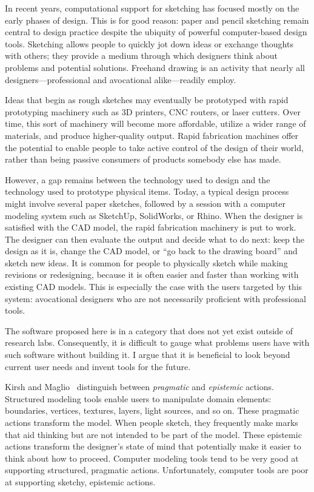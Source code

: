 \documentclass[12pt]{article}
\begin{document}
In recent years, computational support for sketching has focused
mostly on the early phases of design. This is for good reason: paper
and pencil sketching remain central to design practice despite the
ubiquity of powerful computer-based design tools. Sketching allows
people to quickly jot down ideas or exchange thoughts with others;
they provide a medium through which designers think about problems and
potential solutions. Freehand drawing is an activity that nearly all
designers---professional and avocational alike---readily employ.

Ideas that begin as rough sketches may eventually be prototyped with
rapid prototyping machinery such as 3D printers, CNC routers, or laser
cutters. Over time, this sort of machinery will become more
affordable, utilize a wider range of materials, and produce
higher-quality output. Rapid fabrication machines offer the potential
to enable people to take active control of the design of their world,
rather than being passive consumers of products somebody else has
made.

However, a gap remains between the technology used to design and the
technology used to prototype physical items. Today, a typical design
process might involve several paper sketches, followed by a session
with a computer modeling system such as SketchUp, SolidWorks, or
Rhino. When the designer is satisfied with the CAD model, the rapid
fabrication machinery is put to work. The designer can then evaluate
the output and decide what to do next: keep the design as it is,
change the CAD model, or ``go back to the drawing board'' and sketch
new ideas. It is common for people to physically sketch while making
revisions or redesigning, because it is often easier and faster than
working with existing CAD models. This is especially the case with the
users targeted by this system: avocational designers who are not
necessarily proficient with professional tools.

The software proposed here is in a category that does not yet exist
outside of research labs. Consequently, it is difficult to gauge what
problems users have with such software without building it. I argue
that it is beneficial to look beyond current user needs and invent
tools for the future.

Kirsh and Maglio~\cite{kirch-epistemic-action} distinguish between
\textit{pragmatic} and \textit{epistemic} actions. Structured modeling
tools enable users to manipulate domain elements: boundaries,
vertices, textures, layers, light sources, and so on. These pragmatic
actions transform the model. When people sketch, they frequently make
marks that aid thinking but are not intended to be part of the
model. These epistemic actions transform the designer's state of mind
that potentially make it easier to think about how to
proceed. Computer modeling tools tend to be very good at supporting
structured, pragmatic actions. Unfortunately, computer tools are poor
at supporting sketchy, epistemic actions.
\end{document}
